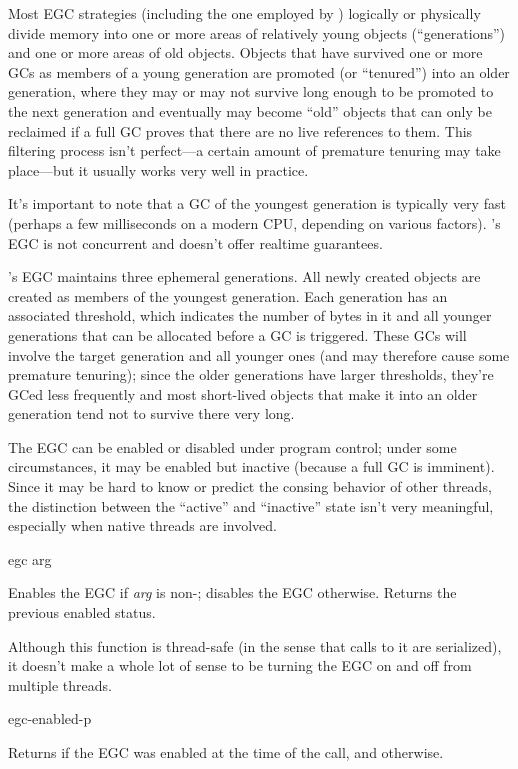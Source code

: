 Most EGC strategies (including the one employed by \CCL) logically or
physically divide memory into one or more areas of relatively young
objects (``generations'') and one or more areas of old objects.  Objects
that have survived one or more GCs as members of a young generation
are promoted (or ``tenured'') into an older generation, where they may
or may not survive long enough to be promoted to the next generation
and eventually may become ``old'' objects that can only be reclaimed if
a full GC proves that there are no live references to them.  This
filtering process isn't perfect---a certain amount of premature
tenuring may take place---but it usually works very well in
practice.

It's important to note that a GC of the youngest generation is
typically very fast (perhaps a few milliseconds on a modern CPU,
depending on various factors). \CCL's EGC is not concurrent and
doesn't offer realtime guarantees.

\CCL's EGC maintains three ephemeral generations.  All newly created
objects are created as members of the youngest generation. Each
generation has an associated threshold, which indicates the
number of bytes in it and all younger generations that can be
allocated before a GC is triggered. These GCs will involve the target
generation and all younger ones (and may therefore cause some
premature tenuring); since the older generations have larger
thresholds, they're GCed less frequently and most short-lived objects
that make it into an older generation tend not to survive there very
long.

The EGC can be enabled or disabled under program control; under some
circumstances, it may be enabled but inactive (because a full GC is
imminent).  Since it may be hard to know or predict the consing
behavior of other threads, the distinction between the ``active'' and
``inactive'' state isn't very meaningful, especially when native
threads are involved.

\begin{defun}[Function]
egc arg

Enables the EGC if {\it arg} is non-; disables the EGC otherwise.
Returns the previous enabled status.

Although this function is thread-safe (in the sense that calls to it
are serialized), it doesn't make a whole lot of sense to be turning
the EGC on and off from multiple threads.
\end{defun}

\begin{defun}[Function]
egc-enabled-p

Returns  if the EGC was enabled at the time of the call, and
 otherwise.
\end{defun}

